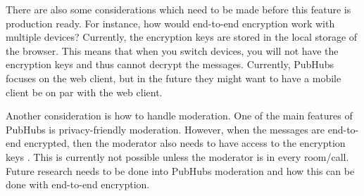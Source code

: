 \documentclass{report}
\begin{document}
There are also some considerations which need to be made before this feature is production ready.
For instance, how would end-to-end encryption work with multiple devices? Currently, the encryption keys are stored in
the local storage of the browser. This means that when you switch devices, you will not have the encryption keys and
thus cannot decrypt the messages. Currently, PubHubs focuses on the web client, but in the future they might want to
have a mobile client be on par with the web client.

Another consideration is how to handle moderation. One of the main features of PubHubs is privacy-friendly
moderation. However, when the messages are end-to-end encrypted, then the moderator also needs to have access to
the encryption keys \cite{noauthor_group_nodate}. This is currently not possible unless the moderator is in every
room/call. Future research needs to be done into PubHubs moderation and how this can be done with end-to-end encryption.

\newpage


\end{document}
